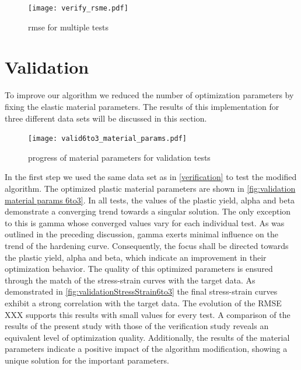     \begin{figure}[H]
		\centering
        \texttt{[image: verify\_rsme.pdf]}
		\caption{rmse for multiple tests}
		\label{fig:rmse progress}
	\end{figure}

    
    \section{Validation}
    To improve our algorithm we reduced the number of optimization parameters by fixing the elastic material parameters. The results of this implementation for three different data sets will be discussed in this section.

    \begin{figure}[H]
		\centering
        \texttt{[image: valid6to3\_material\_params.pdf]}
		\caption{progress of material parameters for validation tests}
		\label{fig:validation material params 6to3}
	\end{figure}

    In the first step we used the same data set as in \autoref{verification} to test the modified algorithm. The optimized plastic material parameters are shown in \autoref{fig:validation material params 6to3}.  In all tests, the values of the plastic yield, alpha and beta demonstrate a converging trend towards a singular solution. The only exception to this is gamma whose converged values vary for each individual test. As was outlined in the preceding discussion, gamma exerts minimal influence on the trend of the hardening curve. Consequently, the focus shall be directed towards the plastic yield, alpha and beta, which indicate an improvement in their optimization behavior.
    The quality of this optimized parameters is ensured through the match of the stress-strain curves with the target data. As demonstrated in \autoref{fig:validationStressStrain6to3} the final stress-strain curves exhibit a strong correlation with the target data. The evolution of the RMSE XXX supports this results with small values for every test. A comparison of the results of the present study with those of the verification study reveals an equivalent level of optimization quality. Additionally, the results of the material parameters indicate a positive impact of the algorithm modification, showing a unique solution for the important parameters. 
     
